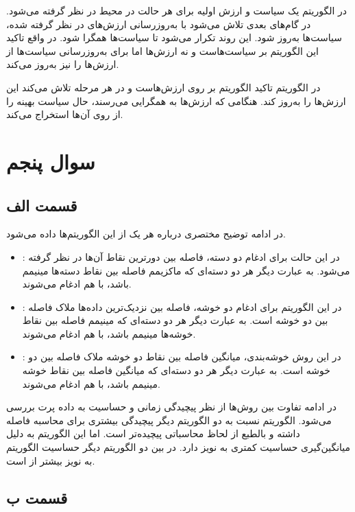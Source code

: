 \documentclass[12pt, a4paper]{article}
\begin{document}
در الگوریتم  یک سیاست و ارزش اولیه برای هر حالت در محیط در نظر گرفته می‌شود.
در گام‌های بعدی تلاش می‌شود با به‌روزرسانی ارزش‌های در نظر گرفته شده، سیاست‌ها به‌روز شود. این روند
تکرار می‌شود تا سیاست‌ها همگرا شود. در واقع تاکید این الگوریتم بر سیاست‌هاست و نه ارزش‌ها اما برای
به‌روزرسانی سیاست‌ها از ارزش‌ها را نیز به‌روز می‌کند.

در الگوریتم  تاکید الگوریتم بر روی ارزش‌هاست و در هر مرحله تلاش می‌کند این ارزش‌ها را
به‌روز کند. هنگامی که ارزش‌ها به همگرایی می‌رسند، حال سیاست بهینه را از روی آن‌ها استخراج می‌کند.

\section*{سوال پنجم}

\subsection*{قسمت الف}

در ادامه توضیح مختصری درباره هر یک از این الگوریتم‌ها داده می‌شود.

\begin{itemize}
    \item {}: در این حالت برای ادغام دو دسته، فاصله بین دورترین نقاط آن‌ها در نظر گرفته می‌شود.
    به عبارت دیگر هر دو دسته‌ای که ماکزیمم فاصله بین نقاط دسته‌ها مینیمم باشد، با هم ادغام می‌شوند.
    \item {}: در این الگوریتم برای ادغام دو خوشه، فاصله بین نزدیک‌ترین داده‌ها ملاک فاصله بین دو
    خوشه است. به عبارت دیگر هر دو دسته‌ای که مینیمم فاصله بین نقاط خوشه‌ها مینیمم باشد، با هم ادغام می‌شوند.
    \item {}: در این روش خوشه‌بندی، میانگین فاصله بین نقاط دو خوشه ملاک فاصله بین دو خوشه است.
    به عبارت دیگر هر دو دسته‌ای که میانگین فاصله بین نقاط خوشه مینیمم باشد، با هم ادغام می‌شوند.
\end{itemize}

در ادامه تفاوت بین روش‌ها از نظر پیچیدگی زمانی و حساسیت به داده پرت بررسی می‌شود.
الگوریتم  نسبت به دو الگوریتم دیگر پیچیدگی بیشتری برای محاسبه فاصله داشته و بالطبع
از لحاظ محاسباتی پیچیده‌تر است. اما این الگوریتم به دلیل میانگین‌گیری حساسیت کمتری به نویز دارد. در بین دو الگوریتم
دیگر حساسیت الگوریتم  به نویز بیشتر از  است.

\subsection*{قسمت ب}
\end{document}
